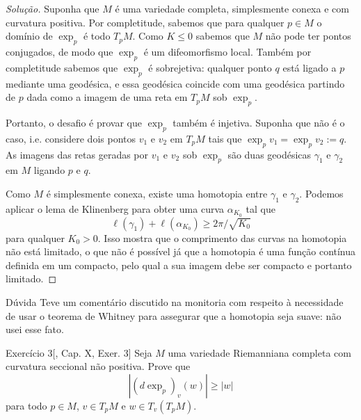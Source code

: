 \begin{proof}[Solução]\leavevmode
	Suponha que \(M\) é uma variedade completa, simplesmente conexa e com curvatura positiva. Por completitude, sabemos que para qualquer \(p \in M\) o domínio de \(\operatorname{exp}_p\) é todo \(T_pM\). Como \(K \leq 0\) sabemos que \(M\) não pode ter pontos conjugados, de modo que  \(\operatorname{exp}_p\) é um difeomorfismo local. Também por completitude sabemos que \(\operatorname{exp}_p\) é sobrejetiva: qualquer ponto \(q\) está ligado a \(p\) mediante uma geodésica, e essa geodésica coincide com uma geodésica partindo de \(p\) dada como a imagem de uma reta em \(T_pM\) sob \(\operatorname{exp}_p\).

	Portanto, o desafio é provar que \(\operatorname{exp}_p\) também é injetiva. Suponha que não é o caso, i.e. considere dois pontos \(v_1\) e \(v_2\) em \(T_pM\) tais que \(\operatorname{exp}_pv_1=\operatorname{exp}_pv_2:=q\). As imagens das retas geradas por \(v_1\) e \(v_2\) sob \(\operatorname{exp}_p\) são duas geodésicas \(\gamma_1\) e \(\gamma_2\) em \(M\) ligando \(p\) e \(q\).

	Como \(M\) é simplesmente conexa, existe uma homotopia entre \(\gamma_1\) e \(\gamma_2\). Podemos aplicar o lema de Klinenberg para obter uma curva \(\alpha_{K_0}\) tal que
	\[\ell(\gamma_1)+\ell(\alpha_{K_0}) \geq 2\pi/\sqrt{K_0}\]
para qualquer \(K_0>0\). Isso mostra que o comprimento das curvas na homotopia não está limitado, o que não é possível já que a homotopia é uma função contínua definida em um compacto, pelo qual a sua imagem debe ser compacto e portanto limitado.
\end{proof}

\begin{thing7}{Dúvida}\leavevmode
Teve um comentário discutido na monitoria com respeito à necessidade de usar o teorema de Whitney para assegurar que a homotopia seja suave: não usei esse fato.
\end{thing7}

\begin{thing6}{Exercício 3}[\cite{doc}, Cap. X, Exer. 3]\label{exer:3}\leavevmode
Seja \(M\) uma variedade Riemanniana completa com curvatura seccional não positiva. Prove que
\[|(d \operatorname{exp}_p)_v(w)|\geq |w|\]
para todo \(p \in M\), \(v \in T_pM\) e \(w \in T_v(T_pM)\).
\end{thing6}

